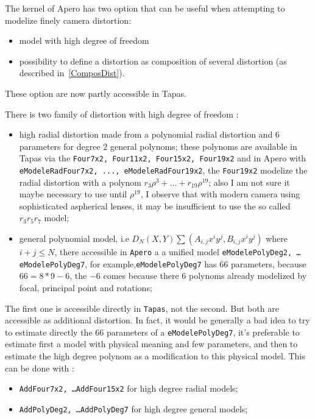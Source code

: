 The kernel of Apero has two option that can be useful when attempting to modelize finely camera distortion:

\begin{itemize}
   \item model with high degree of freedom
   \item possibility to define a distortion as composition of several distortion (as described in~\ref{ComposDist}).
\end{itemize}

These option are now partly accessible in Tapas.

There is two family of distortion with high degree of freedom :


\begin{itemize}
   \item high radial distortion made from a polynomial radial distortion and $6$ parameters for degree $2$
         general polynoms; these polynoms are available in Tapas via the {\tt Four7x2, Four11x2, Four15x2, Four19x2}
         and in Apero with {\tt eModeleRadFour7x2, ..., eModeleRadFour19x2}, the {\tt Four19x2} modelize the radial
         distortion with a polynom $r_3 \rho^3 +\dots + r_{19} \rho^{19}$; also I am not sure it maybe necessary to
         use until $ \rho^{19}$, I observe that with modern camera using sophisticated aspherical lenses, it may be
         insufficient to use the so called $r_3 r_5 r_7$ model;


   \item general polynomial model, i.e $D_N(X,Y) \sum (A_{i,j} x^iy^j,B_{i,j} x^iy^j)$  where $i+j\leq N$,
         there accessible in {\tt Apero} a a unified model {\tt eModelePolyDeg2, \dots eModelePolyDeg7},
         for example,{\tt eModelePolyDeg7} has $66$ parameters, because $66=8*9-6$, the $-6$ comes because
         there $6$ polynoms already modelized by focal, principal point and rotations;
\end{itemize}

The first one is accessible directly in {\tt Tapas}, not the second. But both are accessible as additional distortion.
In fact, it would be generally a bad idea to try to estimate directly the $66$ parameters of a {\tt eModelePolyDeg7}, it's
preferable to estimate first a model with physical meaning and few parameters, and then to estimate the high degree polynom as a modification to this physical model. This can be done with :

\begin{itemize}
    \item  {\tt AddFour7x2,  \dots AddFour15x2} for high degree radial models;
    \item  {\tt AddPolyDeg2, \dots AddPolyDeg7} for high degree general models;
\end{itemize}

